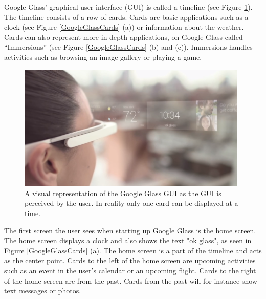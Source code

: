 Google Glass' graphical user interface (GUI) is called a timeline (see Figure \ref{GoogleGlassUI}).\cite{ImagesGoogleGlassUI} The timeline consists of a row of cards. Cards are basic applications such as a clock (see Figure \ref{GoogleGlassCards} (a)) or information about the weather. Cards can also represent more in-depth applications, on Google Glass called ``Immersions'' (see Figure \ref{GoogleGlassCards} (b) and (c)). Immersions handles activities such as browsing an image gallery or playing a game.

	\begin{figure}[ht!]
		\centering
		\includegraphics[width=110mm]{images/GoogleGlassUI}
		\caption{A visual representation of the Google Glass GUI as the GUI is perceived by the user. In reality only one card can be displayed at a time.\cite{ImagesGoogleGlassUI}}
		\label{GoogleGlassUI}
	\end{figure}

The first screen the user sees when starting up Google Glass is the home screen. The home screen displays a clock and also shows the text "ok glass", as seen in Figure \ref{GoogleGlassCards} (a). The home screen is a part of the timeline and acts as the center point. Cards to the left of the home screen are upcoming activities such as an event in the user's calendar or an upcoming flight. Cards to the right of the home screen are from the past. Cards from the past will for instance show text messages or photos.

